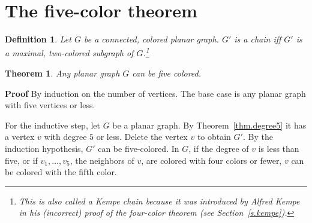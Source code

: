 \documentclass[11pt,a4paper]{article}
\newtheorem{theorem}{Theorem}
\newtheorem{definition}{Definition}
\begin{document}
\begin{center}
\end{center}


\section{The five-color theorem}

\begin{definition}
Let $G$ be a connected, colored planar graph. $G'$ is a \emph{chain} iff $G'$ is a maximal, two-colored subgraph of $G$.\footnote{This is also called a \emph{Kempe chain} because it was introduced by Alfred Kempe in his (incorrect) proof of the four-color theorem (see Section~\ref{s.kempe}).}
\end{definition}

\begin{theorem}\label{thm.fivecolor}
Any planar graph $G$ can be five colored.
\end{theorem}

\textbf{Proof} By induction on the number of vertices. The base case is any planar graph with five vertices or less.

For the inductive step, let $G$ be a planar graph. By Theorem~\ref{thm.degree5} it has a vertex $v$ with degree $5$ or less. Delete the vertex $v$ to obtain $G'$. By the induction hypothesis, $G'$ can be five-colored. In $G$, if the degree of $v$ is less than five, or if $v_1,\ldots,v_5$, the neighbors of $v$, are colored with four colors or fewer, $v$ can be colored with the fifth color.
\end{document}
